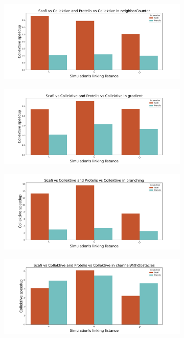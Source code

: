 \begin{figure}[ht!]
    \centering
    \begin{subfigure}[b]{0.49\textwidth}
        \centering
        \includegraphics[width=\textwidth]{figures/neighborCounter-speedup}
    \end{subfigure}
    \begin{subfigure}[b]{0.49\textwidth}
        \centering
        \includegraphics[width=\textwidth]{figures/gradient-speedup}
    \end{subfigure}
    \begin{subfigure}[b]{0.49\textwidth}
        \centering
        \includegraphics[width=\textwidth]{figures/branching-speedup}
    \end{subfigure}
    \begin{subfigure}[b]{0.49\textwidth}
        \centering
        \includegraphics[width=\textwidth]{figures/channelWithObstacles-speedup}

\end{subfigure}
\end{figure}
